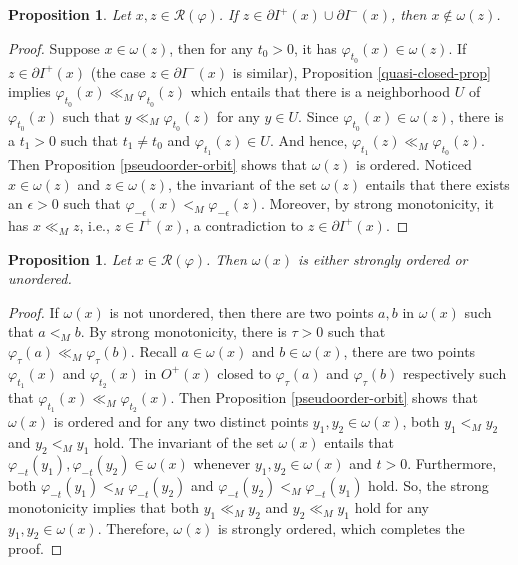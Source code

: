 \documentclass[a4paper,11pt]{article}
\theoremstyle{plain}
\newtheorem{prop}[thm]{Proposition}
\theoremstyle{definition}
\numberwithin{equation}{section}
\begin{document}
\begin{prop}\label{notin}
	Let $x,z\in \mathcal{R}(\varphi)$. If $z\in \partial I^{+}(x)\cup \partial I^{-}(x)$, then $x\notin \omega(z)$.
\end{prop}

\begin{proof}
	Suppose $x\in \omega(z)$, then for any $t_0>0$, it has $\varphi_{t_0}(x)\in \omega(z)$. If $z\in \partial I^+(x)$ (the case $z\in \partial I^-(x)$ is similar), Proposition \ref{quasi-closed-prop} implies $\varphi_{t_0}(x)\ll_M \varphi_{t_0}(z)$ which entails that there is a neighborhood $U$ of $\varphi_{t_0}(x)$ such that $y\ll_M \varphi_{t_0}(z)$ for any $y\in U$. Since $\varphi_{t_0}(x)\in \omega(z)$, there is a $t_1>0$ such that $t_1\neq t_0$ and $\varphi_{t_1}(z)\in U$. And hence, $\varphi_{t_1}(z)\ll_M \varphi_{t_0}(z)$. Then Proposition \ref{pseudoorder-orbit} shows that $\omega(z)$ is ordered. Noticed $x\in \omega(z)$ and $z\in \omega(z)$, the invariant of the set $\omega(z)$ entails that there exists an $\epsilon>0$ such that $\varphi_{-\epsilon}(x)<_M \varphi_{-\epsilon}(z)$. Moreover, by strong monotonicity, it has $x\ll_M z$, i.e., $z\in I^{+}(x)$, a contradiction to $z\in \partial I^+(x)$.
\end{proof}
	

\begin{prop}\label{ou}
	Let $x\in \mathcal{R}(\varphi)$. Then $\omega(x)$ is either strongly ordered or unordered.
\end{prop}

\begin{proof}
	If $\omega(x)$ is not unordered, then there are two points $a,b$ in $\omega(x)$ such that $a<_M b$. By strong monotonicity, there is $\tau>0$ such that $\varphi_{\tau}(a)\ll_M \varphi_{\tau}(b)$. Recall $a\in\omega(x)$ and $b\in\omega(x)$, there are two points $\varphi_{t_1}(x)$ and $\varphi_{t_2}(x)$ in $O^{+}(x)$ closed to $\varphi_{\tau}(a)$ and $\varphi_{\tau}(b)$ respectively such that $\varphi_{t_1}(x)\ll_M \varphi_{t_2}(x)$. Then Proposition \ref{pseudoorder-orbit} shows that $\omega(x)$ is ordered and for any two distinct points $y_1, y_2 \in \omega(x)$, both $y_1<_M y_2$ and $y_2<_M y_1$ hold. The invariant of the set $\omega(x)$ entails that $\varphi_{-t}(y_1), \varphi_{-t}(y_2)\in \omega(x)$ whenever $y_1, y_2 \in \omega(x)$ and $t>0$. Furthermore, both $\varphi_{-t}(y_1)<_M \varphi_{-t}(y_2)$ and $\varphi_{-t}(y_2)<_M \varphi_{-t}(y_1)$ hold. So, the strong monotonicity implies that both $y_1\ll_M y_2$ and $y_2\ll_M y_1$ hold for any $y_1, y_2 \in \omega(x)$. Therefore, $\omega(z)$ is strongly ordered, which completes the proof.
\end{proof}
\end{document}
